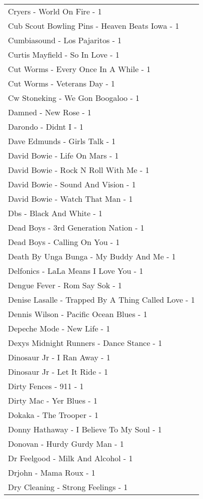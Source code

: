 \documentclass[
]{article}
\begin{document}
\begin{longtable}{l}
Cryers - World On Fire - 1 \\ 
Cub Scout Bowling Pins - Heaven Beats Iowa - 1 \\ 
Cumbiasound - Los Pajaritos - 1 \\ 
Curtis Mayfield - So In Love - 1 \\ 
Cut Worms - Every Once In A While - 1 \\ 
Cut Worms - Veterans Day - 1 \\ 
Cw Stoneking - We Gon Boogaloo - 1 \\ 
Damned - New Rose - 1 \\ 
Darondo - Didnt I - 1 \\ 
Dave Edmunds - Girls Talk - 1 \\ 
David Bowie - Life On Mars - 1 \\ 
David Bowie - Rock N Roll With Me - 1 \\ 
David Bowie - Sound And Vision - 1 \\ 
David Bowie - Watch That Man - 1 \\ 
Dbs - Black And White - 1 \\ 
Dead Boys - 3rd Generation Nation - 1 \\ 
Dead Boys - Calling On You - 1 \\ 
Death By Unga Bunga - My Buddy And Me - 1 \\ 
Delfonics - LaLa Means I Love You - 1 \\ 
Dengue Fever - Rom Say Sok - 1 \\ 
Denise Lasalle - Trapped By A Thing Called Love - 1 \\ 
Dennis Wilson - Pacific Ocean Blues - 1 \\ 
Depeche Mode - New Life - 1 \\ 
Dexys Midnight Runners - Dance Stance - 1 \\ 
Dinosaur Jr - I Ran Away - 1 \\ 
Dinosaur Jr - Let It Ride - 1 \\ 
Dirty Fences - 911 - 1 \\ 
Dirty Mac - Yer Blues - 1 \\ 
Dokaka - The Trooper - 1 \\ 
Donny Hathaway - I Believe To My Soul - 1 \\ 
Donovan - Hurdy Gurdy Man - 1 \\ 
Dr Feelgood - Milk And Alcohol - 1 \\ 
Drjohn - Mama Roux - 1 \\ 
Dry Cleaning - Strong Feelings - 1 \\ 

\end{longtable}
\end{document}
